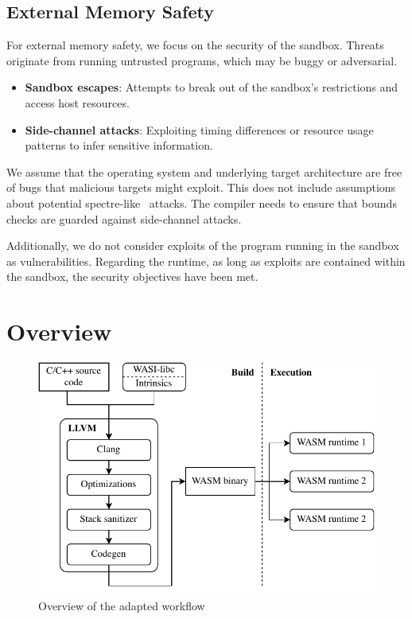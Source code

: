 \subsection{External Memory Safety}
\label{subsec:external-memory-safety}

For external memory safety, we focus on the security of the sandbox.
Threats originate from running untrusted programs, which may be buggy or adversarial.

\begin{itemize}
    \item \textbf{Sandbox escapes}: Attempts to break out of the sandbox's restrictions and access host resources.
    \item \textbf{Side-channel attacks}: Exploiting timing differences or resource usage patterns to infer sensitive information.
\end{itemize}

We assume that the operating system and underlying target architecture are free of bugs that malicious targets might exploit.
This does not include assumptions about potential spectre-like~\cite{kocher2020spectre} attacks.
The compiler needs to ensure that bounds checks are guarded against side-channel attacks.

Additionally, we do not consider exploits of the program running in the sandbox as vulnerabilities.
Regarding the runtime, as long as exploits are contained within the sandbox, the security objectives have been met.

\section{Overview}
\label{sec:overview}

\begin{figure}[t]
    \centering
    \includegraphics{figures/build/overview}
    \caption{Overview of the adapted workflow}
    \label{fig:overview}
\end{figure}

